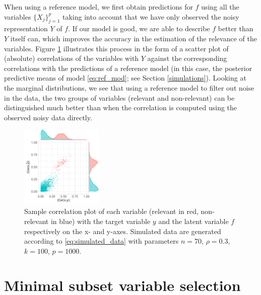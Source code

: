 \documentclass[a4]{article}
\theoremstyle{definition}
\begin{document}
When using a reference model, we first obtain predictions for $f$
using all the variables $\{X_{j}\}_{j=1}^{p}$ taking into account
that we have only observed the noisy representation $Y$ of $f$. If our
model is good, we are able to describe $f$ better than $Y$ itself can,
which improves the accuracy in the estimation of the relevance of the
variables.  Figure \ref{fig:correlation} illustrates this process in
the form of a scatter plot of (absolute) correlations of the
variables with $Y$ against the corresponding correlations with the
predictions of a reference model (in this case, the posterior
predictive means of model \eqref{eq:ref_mod}; see Section
\ref{simulations}). Looking at the marginal distributions, we see
that using a reference model to filter out noise in the data, the two
groups of variables (relevant and non-relevant) can be distinguished
much better than when the correlation is computed using the observed
noisy data directly.
\begin{figure}[tp]
  \centering
  \vspace{-5mm}
  \includegraphics[width=0.35\textwidth]{graphics/correlation.pdf}
  \vspace{-0.5\baselineskip}
  \caption{Sample correlation plot of each variable (relevant in red, 
  non-relevant in blue) with the target variable $y$ and the latent variable 
  $f$ respectively on the x- and y-axes. Simulated data are generated according to 
  \eqref{eq:simulated_data} with parameters $n=70$, $\rho=0.3$,
  $k=100$, $p=1000$.}
  \label{fig:correlation}
\end{figure}


\hypertarget{comparison-minimal-subset}{
\section{Minimal subset variable selection}\label{comparison-minimal-subset}}
\end{document}
